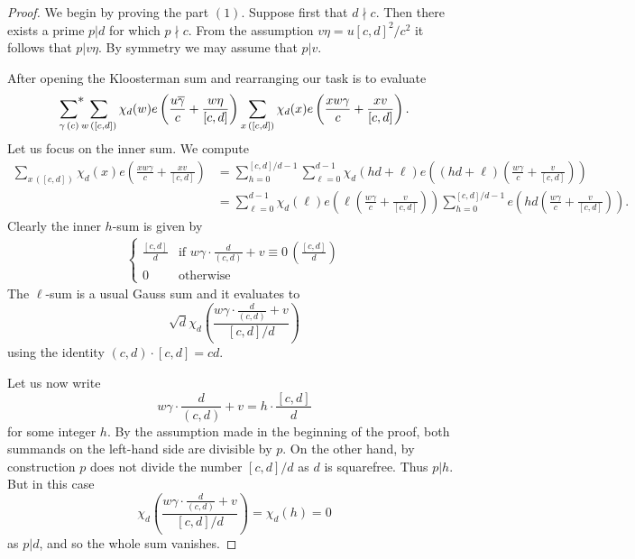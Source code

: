 \documentclass[a4paper,10pt,twoside]{amsart}
\theoremstyle{definition}
\numberwithin{equation}{section}
\renewcommand\:{\colon}
\begin{document}
\begin{proof}
We begin by proving the part $(1)$. Suppose first that $d\nmid c$. Then there exists a prime $p|d$ for which $p\nmid c$. From the assumption $v\eta=u[c,d]^2/c^2$ it follows that $p|v\eta$. By symmetry we may assume that $p|v$.

After opening the Kloosterman sum and rearranging our task is to evaluate
\begin{align}\label{char-sum-factor}
\mathop{{\sum}^{\makebox[0pt][l]{$*$}}}_{\gamma\,(c)}\sum_{w\,([c,d])}\chi_d(w)e\left(\frac{u\overline\gamma}c+\frac{w\eta}{[c,d]}\right)\sum_{x\,([c,d])}\chi_d(x)e\left(\frac{xw\gamma}c+\frac{xv}{[c,d]}\right).
\end{align}
Let us focus on the inner sum. We compute
\begin{align*}
\sum_{x\,([c,d])}\chi_d(x)e\left(\frac{xw\gamma}c+\frac{xv}{[c,d]}\right)&=\sum_{h=0}^{[c,d]/d-1}\sum_{\ell=0}^{d-1}\chi_d(hd+\ell)e\left((hd+\ell)\left(\frac{w\gamma}c+\frac v{[c,d]}\right)\right)\\
&=\sum_{\ell=0}^{d-1}\chi_d(\ell)e\left(\ell\left(\frac{w\gamma}c+\frac v{[c,d]}\right)\right)\sum_{h=0}^{[c,d]/d-1}e\left(hd\left(\frac{w\gamma}c+\frac v{[c,d]}\right)\right).
\end{align*}
Clearly the inner $h$-sum is given by
\begin{align*}
\begin{cases}
\frac{[c,d]}d & \text{if }w\gamma\cdot\frac d{(c,d)}+v\equiv 0\,\left(\frac{[c,d]}d\right) \\
0 & \text{otherwise}
\end{cases}
\end{align*}
The $\ell$-sum is a usual Gauss sum and it evaluates to 
\[ 
\sqrt d\chi_d\left(\frac{w\gamma\cdot\frac d{(c,d)}+v}{[c,d]/d}\right)
\]
using the identity $(c,d)\cdot[c,d]=cd$.

Let us now write
\[ 
w\gamma\cdot\frac d{(c,d)}+v=h\cdot\frac{[c,d]}d
\]
for some integer $h$. By the assumption made in the beginning of the proof, both summands on the left-hand side are divisible by $p$. On the other hand, by construction $p$ does not divide the number $[c,d]/d$ as $d$ is squarefree. Thus $p|h$. But in this case 
\[ 
\chi_d\left(\frac{w\gamma\cdot\frac d{(c,d)}+v}{[c,d]/d}\right)=\chi_d(h)=0
\]
as $p|d$, and so the whole sum vanishes. 


\end{proof}
\end{document}
